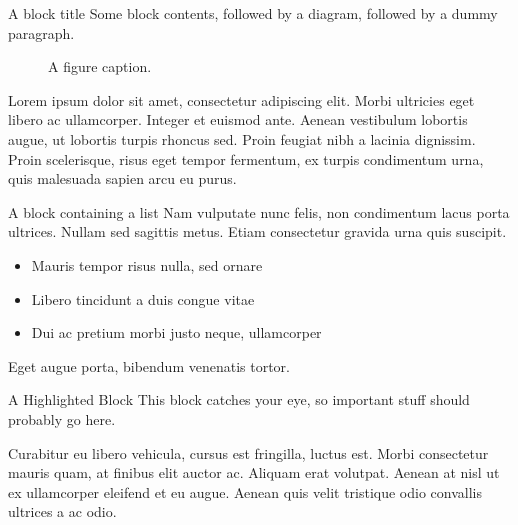 \documentclass[final]{beamer}
\begin{document}
\begin{frame}[label={sec:orgd60d47b}]{}
\begin{columns}
\begin{column}{0.3\columnwidth}
\begin{block}{A block title}
Some block contents, followed by a diagram, followed by a dummy paragraph.

\begin{figure}
  \centering
  \caption{A figure caption.}
\end{figure}

Lorem ipsum dolor sit amet, consectetur adipiscing elit. Morbi ultricies eget
libero ac ullamcorper. Integer et euismod ante. Aenean vestibulum lobortis
augue, ut lobortis turpis rhoncus sed. Proin feugiat nibh a lacinia
dignissim. Proin scelerisque, risus eget tempor fermentum, ex turpis condimentum
urna, quis malesuada sapien arcu eu purus.
\end{block}

\begin{block}{A block containing a list}
Nam vulputate nunc felis, non condimentum lacus porta ultrices. Nullam sed
sagittis metus. Etiam consectetur gravida urna quis suscipit.

\begin{itemize}
\item \alert{Mauris tempor} risus nulla, sed ornare
\item \alert{Libero tincidunt} a duis congue vitae
\item \alert{Dui ac pretium} morbi justo neque, ullamcorper
\end{itemize}

Eget augue porta, bibendum venenatis tortor.
\end{block}

\begin{alertblock}{A Highlighted Block}
This block catches your eye, so \alert{important stuff} should probably go
here.

Curabitur eu libero vehicula, cursus est fringilla, luctus est. Morbi
consectetur mauris quam, at finibus elit auctor ac. Aliquam erat volutpat.
Aenean at nisl ut ex ullamcorper eleifend et eu augue. Aenean quis velit
tristique odio convallis ultrices a ac odio.


\end{alertblock}
\end{column}
\end{columns}
\end{frame}
\end{document}
